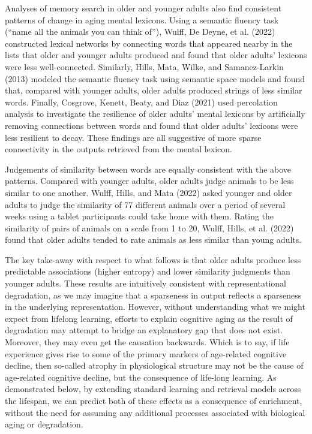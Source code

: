 \documentclass[
  man]{apa6}
\begin{document}
Analyses of memory search in older and younger adults also find consistent patterns of change in aging mental lexicons. Using a semantic fluency task (``name all the animals you can think of''), Wulff, De Deyne, et al. (2022) constructed lexical networks by connecting words that appeared nearby in the lists that older and younger adults produced and found that older adults' lexicons were less well-connected. Similarly, Hills, Mata, Wilke, and Samanez-Larkin (2013) modeled the semantic fluency task using semantic space models and found that, compared with younger adults, older adults produced strings of less similar words. Finally, Cosgrove, Kenett, Beaty, and Diaz (2021) used percolation analysis to investigate the resilience of older adults' mental lexicons by artificially removing connections between words and found that older adults' lexicons were less resilient to decay. These findings are all suggestive of more sparse connectivity in the outputs retrieved from the mental lexicon.

Judgements of similarity between words are equally consistent with the above patterns. Compared with younger adults, older adults judge animals to be less similar to one another. Wulff, Hills, and Mata (2022) asked younger and older adults to judge the similarity of 77 different animals over a period of several weeks using a tablet participants could take home with them. Rating the similarity of pairs of animals on a scale from 1 to 20, Wulff, Hills, et al. (2022) found that older adults tended to rate animals as less similar than young adults.

The key take-away with respect to what follows is that older adults produce less predictable associations (higher entropy) and lower similarity judgments than younger adults. These results are intuitively consistent with representational degradation, as we may imagine that a sparseness in output reflects a sparseness in the underlying representation. However, without understanding what we might expect from lifelong learning, efforts to explain cognitive aging as the result of degradation may attempt to bridge an explanatory gap that does not exist. Moreover, they may even get the causation backwards. Which is to say, if life experience gives rise to some of the primary markers of age-related cognitive decline, then so-called atrophy in physiological structure may not be the cause of age-related cognitive decline, but the consequence of life-long learning. As demonstrated below, by extending standard learning and retrieval models across the lifespan, we can predict both of these effects as a consequence of enrichment, without the need for assuming any additional processes associated with biological aging or degradation.
\end{document}
